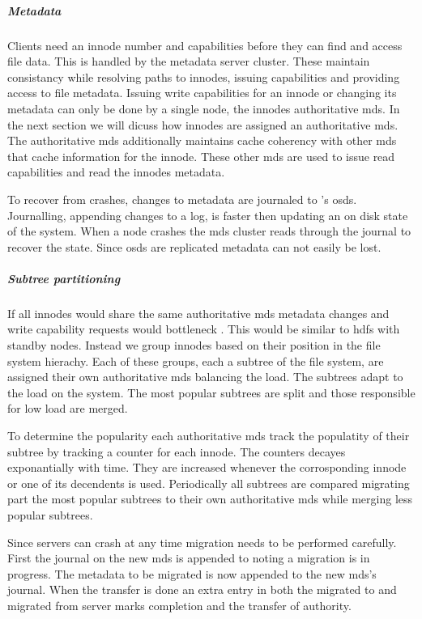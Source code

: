 \subparagraph{Metadata}
Clients need an innode number and capabilities before they can find and access file data. This is handled by the metadata server cluster. These maintain consistancy while resolving paths to innodes, issuing capabilities and providing access to file metadata. Issuing write capabilities for an innode or changing its metadata can only be done  by a single node, the innodes authoritative \ac{mds}. In the next section we will dicuss how innodes are assigned an authoritative \ac{mds}. The authoritative \ac{mds} additionally maintains cache coherency with other \ac{mds} that cache information for the innode. These other \ac{mds} are used to issue read capabilities and read the innodes metadata.

To recover from crashes, changes to metadata are journaled to 's \acfp{osd}. Journalling, appending changes to a log, is faster then updating an on disk state of the system. When a node crashes the \ac{mds} cluster reads through the journal to recover the state. Since \acp{osd} are replicated metadata can not easily be lost.

\subparagraph{Subtree partitioning}
If all innodes would share the same authoritative \ac{mds} metadata changes and write capability requests would bottleneck . This would be similar to \ac{hdfs} with standby nodes. Instead we group innodes based on their position in the file system hierachy. Each of these groups, each a subtree of the file system, are assigned their own authoritative \ac{mds} balancing the load. The subtrees adapt to the load on the system. The most popular subtrees are split and those responsible for low load are merged.

To determine the popularity each authoritative \ac{mds} track the populatity of their subtree by tracking a counter for each innode. The counters decayes exponantially with time. They are increased whenever the corrosponding innode or one of its decendents is used. Periodically all subtrees are compared migrating part the most popular subtrees to their own authoritative \ac{mds} while merging less popular subtrees.

Since servers can crash at any time migration needs to be performed carefully. First the journal on the new \ac{mds} is appended to noting a migration is in progress. The metadata to be migrated is now appended to the new \ac{mds}'s journal. When the transfer is done an extra entry in both the migrated to and migrated from server marks completion and the transfer of authority. 
